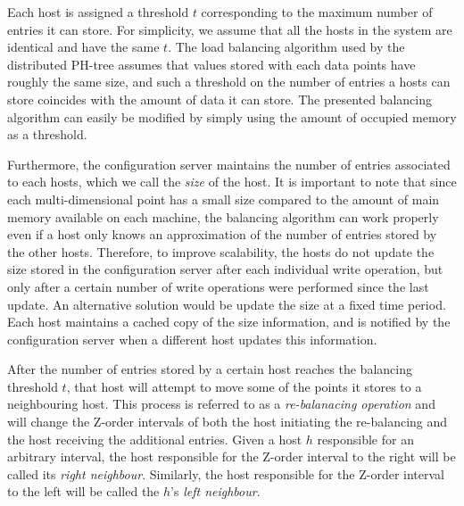 \documentclass[11pt,a4paper]{globis-book}
\begin{document}
Each host is assigned a threshold $t$ corresponding to the maximum number of entries it can store. For simplicity, we assume that all the hosts in the system are identical and have the same $t$. The load balancing algorithm used by the distributed PH-tree assumes that values stored with each data points have roughly the same size, and such a threshold on the number of entries a hosts can store coincides with the amount of data it can store. The presented balancing algorithm can easily be modified by simply using the amount of occupied memory as a threshold. 

Furthermore, the configuration server maintains the number of entries associated to each hosts, which we call the \textit{size} of the host. It is important to note that since each multi-dimensional point has a small size compared to the amount of main memory available on each machine, the balancing algorithm can work properly even if a host only knows an approximation of the number of entries stored by the other hosts. Therefore, to improve scalability, the hosts do not update the size stored in the configuration server after each individual write operation, but only after a certain number of write operations were performed since the last update. An alternative solution would be update the size at a fixed time period. Each host maintains a cached copy of the size information, and is notified by the configuration server when a different host updates this information.

After the number of entries stored by a certain host reaches the balancing threshold $t$, that host will attempt to move some of the points it stores to a neighbouring host. This process is referred to as a \textit{re-balanacing operation} and will change the Z-order intervals of both the host initiating the re-balancing and the host receiving the additional entries.
Given a host $h$ responsible for an arbitrary interval, the host responsible for the Z-order interval to the right will be called its \textit{right neighbour}. Similarly, the host responsible for the Z-order interval to the left will be called the $h$'s \textit{left neighbour}. 
\end{document}
